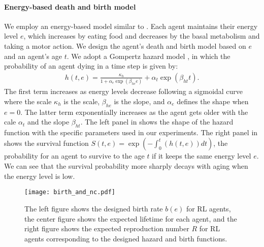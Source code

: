 \paragraph{Energy-based death and birth model}
We employ an energy-based model similar to \citet{hamonEcoevolutionaryDynamicsNonepisodic2023}. Each agent maintains their energy level $e$,
which increases by eating food and decreases by the basal metabolism and taking a motor action.
We design the agent's death and birth model
based on $e$ and an agent's age $t$.
We adopt a Gompertz hazard model \citep{gompertzXXIVNatureFunction1825,kirkwoodDecipheringDeathCommentary2015}, in which the probability of an agent dying in a time step is given by:
\begin{align}
  h(t, e) = \frac{\kappa_{h}}{1 + \alpha_{e}\exp(\beta_{he}e)} + \alpha_{t} \exp(\beta_{ht} t).
  \label{eq:h}
\end{align}
The first term increases as energy levels decrease following a sigmoidal curve where the scale $\kappa_{h}$ is the scale, $\beta_{he}$ is the slope, and $\alpha_{e}$ defines the shape when $e=0$.
The latter term exponentially increases as the agent gets older with the cale $\alpha_{t}$ and the slope $\beta_{ht}$.
The left panel in  shows the shape of the hazard function with the specific parameters used in our experiments.
The right panel in  shows the survival function $S(t, e) = \exp (-\int_{0}^{t}(h(t, e)) dt)$, the probability for an agent to survive to the age $t$ if it keeps the same energy level $e$.
We can see that the survival probability more sharply decays with aging when the energy level is low.

\begin{figure}[t]
  \centering{}
  \texttt{[image: birth\_and\_nc.pdf]}
  \caption{
    The left figure shows the designed birth rate $b(e)$ for RL agents, the center figure shows the expected lifetime for each agent, and the right figure shows the expected reproduction number $R$ for RL agents corresponding to the designed hazard and birth functions.
  }\label{figure:bnc}
\end{figure}

